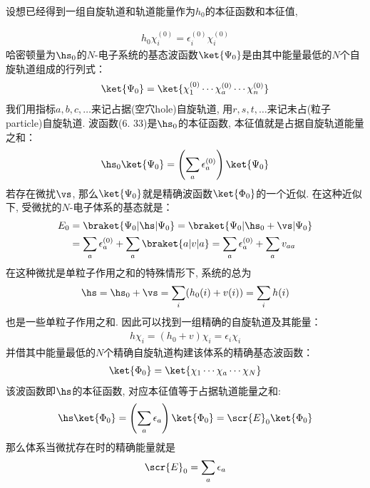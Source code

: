 设想已经得到一组自旋轨道和轨道能量作为$h_0$的本征函数和本征值,

\begin{align}
h_0\chi_i^{(0)} = \epsilon_i^{(0)} \chi_i^{(0)}
\end{align}
哈密顿量为$\hs_0$的$N$-电子系统的基态波函数$\ket{\Psi_0}$是由其中能量最低的$N$个自旋轨道组成的行列式：
\begin{align}
\ket{\Psi_0} = \ket{\chi_1^{(0)}\cdots\chi_a^{(0)}\cdots\chi_n^{(0)}}
\end{align}
我们用指标$a,b,c,\ldots$来记占据(空穴hole)自旋轨道, 
用$r,s,t,\ldots$来记未占(粒子particle)自旋轨道. 
波函数(6.
33)是$\hs_0$的本征函数, 
本征值就是占据自旋轨道能量之和：
\begin{align*}
\hs_0\ket{\Psi_0} = \left( \sum_a\epsilon_a^{(0)} \right)\ket{\Psi_0}
\end{align*}
若存在微扰$\vs$, 
那么$\ket{\Psi_0}$就是精确波函数$\ket{\Phi_0}$的一个近似. 
在这种近似下, 
受微扰的$N$-电子体系的基态就是：
\begin{align}
E_0 & = \braket{\Psi_0|\hs|\Psi_0} = \braket{\Psi_0|\hs_0+\vs|\Psi_0}\notag\\
    & = \sum_a\epsilon_a^{(0)} + \sum_a\braket{a|v|a} = \sum_a\epsilon_a^{(0)} + \sum_av_{aa}
\end{align}
在这种微扰是单粒子作用之和的特殊情形下, 
系统的总\ha 为
\begin{align}
\hs = \hs_0 + \vs = \sum_i(h_0(i)+v(i)) = \sum_ih(i) 
\end{align}
也是一些单粒子作用之和. 
因此可以找到一组精确的自旋轨道及其能量：
\begin{align}
h\chi_i = (h_0+v)\chi_i = \epsilon_i\chi_i
\end{align}
并借其中能量最低的$N$个精确自旋轨道构建该体系的精确基态波函数：
\begin{align}
\ket{\Phi_0} = \ket{\chi_1\cdots\chi_a\cdots\chi_N}
\end{align}
该波函数即$\hs$的本征函数, 
对应本征值等于占据轨道能量之和:
\begin{align*}
\hs\ket{\Phi_0} = \left(\sum_a\epsilon_a \right)\ket{\Phi_0} = \scr{E}_0\ket{\Phi_0}
\end{align*}
那么体系当微扰存在时的精确能量就是
\begin{align}
\scr{E}_0 = \sum_a\epsilon_a
\end{align}

